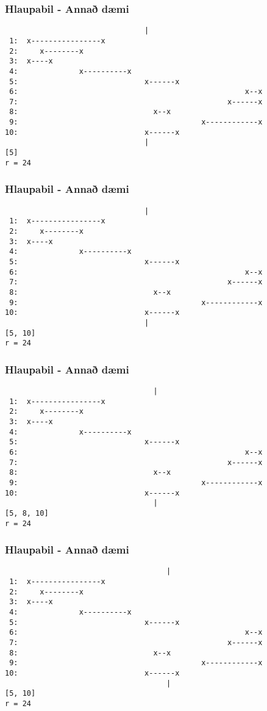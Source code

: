 \documentclass{beamer}
\begin{document}
\begin{frame}[fragile]
	\frametitle{Hlaupabil - Annað dæmi}
\begin{verbatim}
                                |
 1:  x----------------x
 2:     x--------x
 3:  x----x
 4:              x----------x
 5:                             x------x
 6:                                                    x--x
 7:                                                x------x
 8:                               x--x
 9:                                          x------------x
10:                             x------x
                                |
[5]
r = 24
\end{verbatim}
\end{frame}
\addtocounter{framenumber}{-1}

\begin{frame}[fragile]
	\frametitle{Hlaupabil - Annað dæmi}
\begin{verbatim}
                                |
 1:  x----------------x
 2:     x--------x
 3:  x----x
 4:              x----------x
 5:                             x------x
 6:                                                    x--x
 7:                                                x------x
 8:                               x--x
 9:                                          x------------x
10:                             x------x
                                |
[5, 10]
r = 24
\end{verbatim}
\end{frame}
\addtocounter{framenumber}{-1}

\begin{frame}[fragile]
	\frametitle{Hlaupabil - Annað dæmi}
\begin{verbatim}
                                  |
 1:  x----------------x
 2:     x--------x
 3:  x----x
 4:              x----------x
 5:                             x------x
 6:                                                    x--x
 7:                                                x------x
 8:                               x--x
 9:                                          x------------x
10:                             x------x
                                  |
[5, 8, 10]
r = 24
\end{verbatim}
\end{frame}
\addtocounter{framenumber}{-1}

\begin{frame}[fragile]
	\frametitle{Hlaupabil - Annað dæmi}
\begin{verbatim}
                                     |
 1:  x----------------x
 2:     x--------x
 3:  x----x
 4:              x----------x
 5:                             x------x
 6:                                                    x--x
 7:                                                x------x
 8:                               x--x
 9:                                          x------------x
10:                             x------x
                                     |
[5, 10]
r = 24
\end{verbatim}
\end{frame}
\addtocounter{framenumber}{-1}
\end{document}

